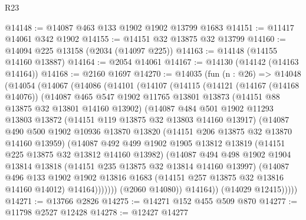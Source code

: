\begin{lexlean}{R23}
\begin{coremodule}
@14148 := @14087 @463 @133 @1902 @1902 @13799 @1683
@14151 := @11417 @14061 @342 @1902
@14155 := @14151 @32 @13875 @32 @13799
@14160 := @14094 @225 @13158 (@2034 (@14097 @225))
@14163 := @14148 (@14155 @14160 @13887)
@14164 := @2054 @14061
@14167 := @14130 (@14142 (@14163 @14164))
@14168 := @2160 @1697
@14270 := @14035
    (fun (n : @26) =>
    @14048
      (@14054
        (@14067
          (@14086
            (@14101
              (@14107
                (@14115
                  (@14121
                    (@14167 (@14168 @14076))
                    (@14087
                      @465
                      @547
                      @1902
                      @11765
                      @13801
                      @13873
                      (@14151 @88 @13875 @32 @13801 @14160 @13902)
                      (@14087
                        @484
                        @501
                        @1902
                        @11293
                        @13803
                        @13872
                        (@14151 @119 @13875 @32 @13803 @14160 @13917)
                        (@14087
                          @490
                          @500
                          @1902
                          @10936
                          @13870
                          @13820
                          (@14151 @206 @13875 @32 @13870 @14160 @13959)
                          (@14087
                            @492
                            @499
                            @1902
                            @1905
                            @13812
                            @13819
                            (@14151 @225 @13875 @32 @13812 @14160 @13982)
                            (@14087
                              @494
                              @498
                              @1902
                              @1904
                              @13814
                              @13818
                              (@14151 @235 @13875 @32 @13814 @14160 @13997)
                              (@14087
                                @496
                                @133
                                @1902
                                @1902
                                @13816
                                @1683
                                (@14151 @257 @13875 @32 @13816 @14160 @14012)
                                @14164)))))))
                  (@2060 @14080))
                @14164))
            (@14029 @12415)))))
@14271 := @13766 @2826
@14275 := @14271 @152 @455 @509 @870
@14277 := @11798 @2527 @12428
@14278 := @12427 @14277

\end{coremodule}
\end{lexlean}
